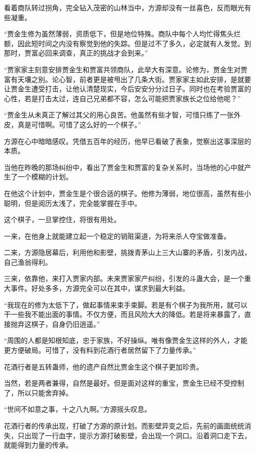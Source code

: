 \begin{this_body}
看着商队转过拐角，完全钻入茂密的山林当中，方源却没有一丝喜色，反而眼光有些凝重。

“贾金生修为虽然薄弱，资质低下，但是地位特殊。商队中每个人均忙得焦头烂额，因此短时间之内没有察觉到他的失踪。但是过不了多久，必定就有人发觉。到那时，贾富必回来调查，真正的挑战才会到来。”

“贾家家主刻意安排贾金生和贾富共领商队，此举大有深意。论修为，贾金生对贾富有天壤之别。论心智，前者更是被甩出了几条大街。贾家家主如此安排，是就要让贾金生遭受打击，让他认清楚现实，今后安安分分过日子。同时也在考验贾富的心性，若是打击太过，连自己兄弟都不容，怎么可能把贾家族长之位给他呢？”

“贾金生从未真正了解过其父的用心良苦。他虽然有些才智，可惜只练了一张外皮，真是可惜啊。可惜了这么好的一个棋子。”

方源在心中暗暗感叹。凭借五百年的经历，他早已看破了表象，觉察出这事深层的本质。

当他在昨晚的那场纠纷中，看出了贾金生和贾富的复杂关系时，当场他的心中就产生了一个模糊的计划。

在他这个计划中，贾金生是个很合适的棋子。他修为薄弱，地位很高，虽然有些小聪明，但是阅历太浅了，完全能掌握在手中。

这个棋子，一旦掌控住，将很有用处。

一来，在他身上就能建立起一个稳定的销赃渠道，为将来杀人夺宝做准备。

二来，方源隐居幕后，利用他和影壁，挑拨青茅山上三大山寨的矛盾，引发内战，自己渔翁得利。

三来，依靠他，来打入贾家内部。未来贾家家产纠纷，引发的斗蛊大会，是一个重大事件。好处多多，方源完全可以在其中，谋求到最大利益。

“我现在的修为太低下了，做起事情来束手束脚。若是有个棋子为我所用，就可以干一些我不能出面的事情。不仅方便，而且风险大大的降低。若是将来暴露了，直接抛弃这棋子，自身仍旧逍遥。”

“周围的人都是知根知底，忠于家族，不好操纵。唯有像贾金生这样的外人，才能更方便破局。可惜了，没有料到花酒行者居然留下了力量传承。”

花酒行者是五转蛊师，他的遗产自然比贾金生这个棋子更加珍贵。

当然，若是两者兼得，自然是最好。但是面对这样的重宝，贾金生已经不受控制了，所以只能舍弃掉。

“世间不如意之事，十之八九啊。”方源摇头叹息。

花酒行者的传承出现，打破了方源的原计划。而影壁异变之后，先前的画面统统消失，只出现了一行血字，提示方源打破影壁，会出现一个洞口。沿着洞口走下去，就能得到力量的传承。


\end{this_body}
